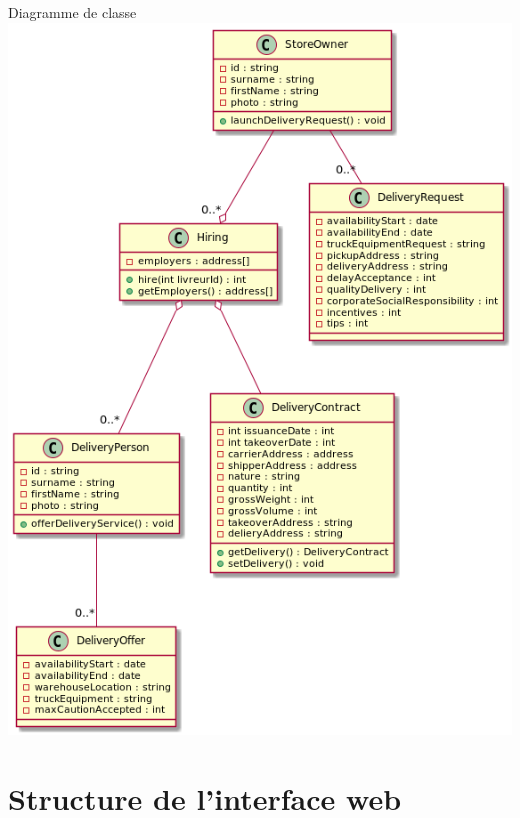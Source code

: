 \documentclass{beamer}
\begin{document}
    \begin{frame}{Diagramme de classe}
        \centering
        \includegraphics[height = .95\textheight]{class_diagram.png}
    \end{frame}

    \section{Structure de l'interface web}
\end{document}
